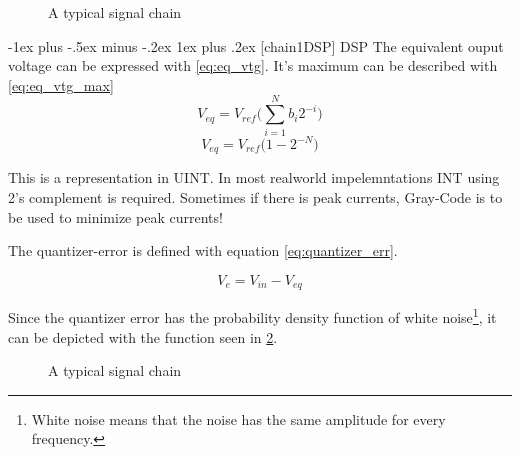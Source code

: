 \documentclass[10pt,landscape]{article}
\makeatletter
\newcommand*\circled[1]{\tikz[baseline=(char.base)]{
            \node[shape=circle,draw,inner sep=2pt] (char) {#1};}}
\renewcommand{\subsubsection}{\@startsection{subsubsection}{3}{0mm}%
                                {-1ex plus -.5ex minus -.2ex}%
                                {1ex plus .2ex}%
                                {\normalfont\small\bfseries}}
\makeatother
\begin{document}
\begin{multicols}{2}
\begin{figure}[H]
\begin{center}
\begin{circuitikz}[x=0.021\linewidth,y=0.021\linewidth]
        \end{circuitikz}
    \end{center}
    \caption{A typical signal chain}
    \label{fig:chain}
\end{figure}

\subsubsection[chain1DSP]{\circled{1} DSP}
The equivalent ouput voltage can be expressed with \ref{eq:eq_vtg}. It's maximum can be described with \ref{eq:eq_vtg_max}
\begin{equation}
    V_{eq} = V_{ref} \Big(\sum^N_{i=1}b_i 2^{-i}\Big)
    \label{eq:eq_vtg}
\end{equation}
\begin{equation}
    V_{eq} = V_{ref}\Big(1 - 2^{-N}\Big)
    \label{eq:eq_vtg_max}
\end{equation}

This is a representation in UINT. In most realworld impelemntations INT using 2's complement is required. Sometimes if there is peak currents, Gray-Code is to be used to minimize peak currents!

The quantizer-error is defined with equation \ref{eq:quantizer_err}.

\begin{equation}
    V_{e} = V_{in} - V_{eq}
    \label{eq:quantizer_err}
\end{equation}

Since the quantizer error has the probability density function of white noise\footnote{White noise means that the noise has the same amplitude for every frequency.}, it can be depicted with the function seen in \ref{fig:prob_dens_func_quantizer}.

\begin{figure}
    \caption{A typical signal chain}
    \label{fig:prob_dens_func_quantizer}
\end{figure}


\end{multicols}
\end{document}
